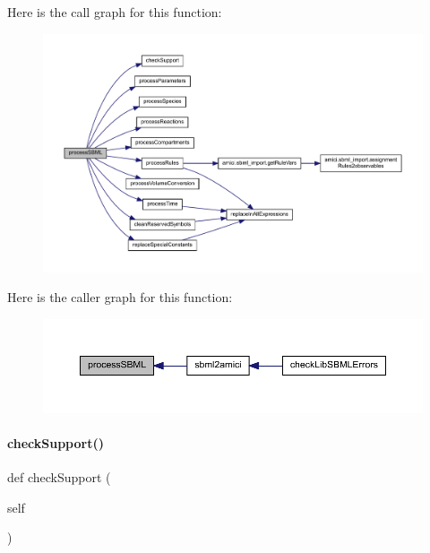 Here is the call graph for this function\+:
\nopagebreak
\begin{figure}[H]
\begin{center}
\leavevmode
\includegraphics[width=350pt]{classamici_1_1sbml__import_1_1_sbml_importer_ac188693ab1d9fc500d55748dbde9bf89_cgraph}
\end{center}
\end{figure}
Here is the caller graph for this function\+:
\nopagebreak
\begin{figure}[H]
\begin{center}
\leavevmode
\includegraphics[width=350pt]{classamici_1_1sbml__import_1_1_sbml_importer_ac188693ab1d9fc500d55748dbde9bf89_icgraph}
\end{center}
\end{figure}
\mbox{\label{classamici_1_1sbml__import_1_1_sbml_importer_ae9585f937c02f0618abeb06dd48bcd54}} 
\paragraph{\texorpdfstring{check\+Support()}{checkSupport()}}
{\footnotesize\ttfamily def check\+Support (\begin{DoxyParamCaption}\item[{}]{self }\end{DoxyParamCaption})}

